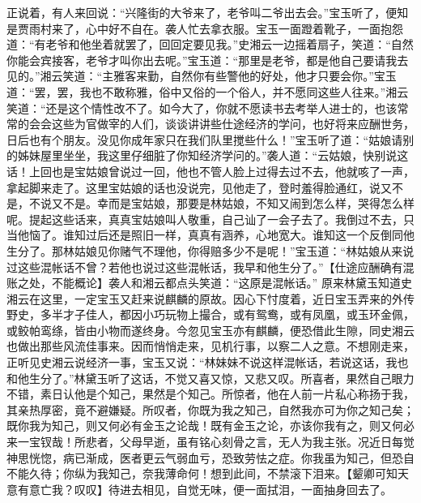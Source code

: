 \documentclass[12pt,oneside]{book}
\begin{document}
正说着，有人来回说：“兴隆街的大爷来了，老爷叫二爷出去会。”宝玉听了，便知是贾雨村来了，心中好不自在。袭人忙去拿衣服。宝玉一面蹬着靴子，一面抱怨道：“有老爷和他坐着就罢了，回回定要见我。”史湘云一边摇着扇子，笑道：“自然你能会宾接客，老爷才叫你出去呢。”宝玉道：“那里是老爷，都是他自己要请我去见的。”湘云笑道：“主雅客来勤，自然你有些警他的好处，他才只要会你。”宝玉道：“罢，罢，我也不敢称雅，俗中又俗的一个俗人，并不愿同这些人往来。”湘云笑道：“还是这个情性改不了。如今大了，你就不愿读书去考举人进士的，也该常常的会会这些为官做宰的人们，谈谈讲讲些仕途经济的学问，也好将来应酬世务，日后也有个朋友。没见你成年家只在我们队里搅些什么！”宝玉听了道：“姑娘请别的姊妹屋里坐坐，我这里仔细脏了你知经济学问的。”袭人道：“云姑娘，快别说这话！上回也是宝姑娘曾说过一回，他也不管人脸上过得去过不去，他就咳了一声，拿起脚来走了。这里宝姑娘的话也没说完，见他走了，登时羞得脸通红，说又不是，不说又不是。幸而是宝姑娘，那要是林姑娘，不知又闹到怎么样，哭得怎么样呢。提起这些话来，真真宝姑娘叫人敬重，自己讪了一会子去了。我倒过不去，只当他恼了。谁知过后还是照旧一样，真真有涵养，心地宽大。谁知这一个反倒同他生分了。那林姑娘见你赌气不理他，你得赔多少不是呢！”宝玉道：“林姑娘从来说过这些混帐话不曾？若他也说过这些混帐话，我早和他生分了。”【仕途应酬确有混账之处，不能概论】袭人和湘云都点头笑道：“这原是混帐话。”
原来林黛玉知道史湘云在这里，一定宝玉又赶来说麒麟的原故。因心下忖度着，近日宝玉弄来的外传野史，多半才子佳人，都因小巧玩物上撮合，或有鸳鸯，或有凤凰，或玉环金佩，或鲛帕鸾绦，皆由小物而遂终身。今忽见宝玉亦有麒麟，便恐借此生隙，同史湘云也做出那些风流佳事来。因而悄悄走来，见机行事，以察二人之意。不想刚走来，正听见史湘云说经济一事，宝玉又说：“林妹妹不说这样混帐话，若说这话，我也和他生分了。”林黛玉听了这话，不觉又喜又惊，又悲又叹。所喜者，果然自己眼力不错，素日认他是个知己，果然是个知己。所惊者，他在人前一片私心称扬于我，其亲热厚密，竟不避嫌疑。所叹者，你既为我之知己，自然我亦可为你之知己矣；既你我为知己，则又何必有金玉之论哉！既有金玉之论，亦该你我有之，则又何必来一宝钗哉！所悲者，父母早逝，虽有铭心刻骨之言，无人为我主张。况近日每觉神思恍惚，病已渐成，医者更云气弱血亏，恐致劳怯之症。你我虽为知己，但恐自不能久待；你纵为我知己，奈我薄命何！想到此间，不禁滚下泪来。【颦卿可知天意有意亡我？叹叹】待进去相见，自觉无味，便一面拭泪，一面抽身回去了。
\end{document}
